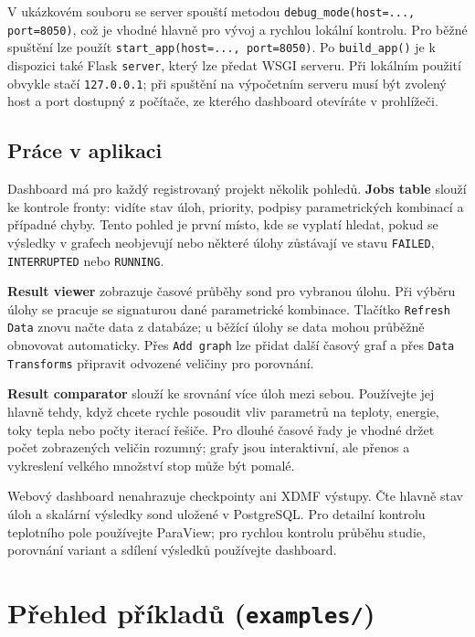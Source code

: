 \documentclass[a4paper,11pt]{article}
\begin{document}
V ukázkovém souboru se server spouští metodou
\texttt{debug\_mode(host=..., port=8050)}, což je vhodné hlavně pro vývoj a
rychlou lokální kontrolu. Pro běžné spuštění lze použít
\texttt{start\_app(host=..., port=8050)}. Po \texttt{build\_app()} je k dispozici
také Flask \texttt{server}, který lze předat WSGI serveru. Při lokálním použití
obvykle stačí \texttt{127.0.0.1}; při spuštění na výpočetním serveru musí být
zvolený host a port dostupný z počítače, ze kterého dashboard otevíráte v
prohlížeči.

\subsection*{Práce v aplikaci}

Dashboard má pro každý registrovaný projekt několik pohledů. \textbf{Jobs table}
slouží ke kontrole fronty: vidíte stav úloh, priority, podpisy parametrických
kombinací a případné chyby. Tento pohled je první místo, kde se vyplatí hledat,
pokud se výsledky v grafech neobjevují nebo některé úlohy zůstávají ve stavu
\texttt{FAILED}, \texttt{INTERRUPTED} nebo \texttt{RUNNING}.

\textbf{Result viewer} zobrazuje časové průběhy sond pro vybranou úlohu. Při
výběru úlohy se pracuje se signaturou dané parametrické kombinace. Tlačítko
\texttt{Refresh Data} znovu načte data z databáze; u běžící úlohy se data mohou
průběžně obnovovat automaticky. Přes \texttt{Add graph} lze přidat další časový
graf a přes \texttt{Data Transforms} připravit odvozené veličiny pro porovnání.

\textbf{Result comparator} slouží ke srovnání více úloh mezi sebou. Používejte
jej hlavně tehdy, když chcete rychle posoudit vliv parametrů na teploty, energie,
toky tepla nebo počty iterací řešiče. Pro dlouhé časové řady je vhodné držet
počet zobrazených veličin rozumný; grafy jsou interaktivní, ale přenos a
vykreslení velkého množství stop může být pomalé.

\begin{noteblock}
Webový dashboard nenahrazuje checkpointy ani XDMF výstupy. Čte hlavně stav úloh
a skalární výsledky sond uložené v PostgreSQL. Pro detailní kontrolu teplotního
pole používejte ParaView; pro rychlou kontrolu průběhu studie, porovnání variant
a sdílení výsledků používejte dashboard.
\end{noteblock}

\section{Přehled příkladů (\texttt{examples/})}\label{sec:examples}
\end{document}
